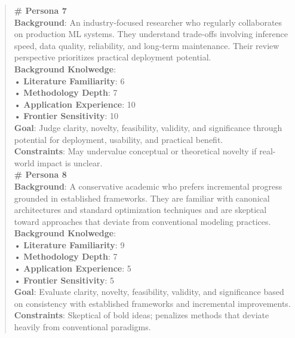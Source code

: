 \begin{quote}
\begin{tcolorbox}[breakable,colback=persona!20!white, colframe=persona!60!black, title=\textbf{Personas}]
        \textbf{\# Persona 7}\\
        \textbf{Background}: An industry-focused researcher who regularly collaborates on production ML systems. They understand trade-offs involving inference speed, data quality, reliability, and long-term maintenance. Their review perspective prioritizes practical deployment potential.\\
        \textbf{Background Knolwedge}:\\
        • \textbf{Literature Familiarity}: 6\\
        • \textbf{Methodology Depth}: 7\\
        • \textbf{Application Experience}: 10\\
        • \textbf{Frontier Sensitivity}: 10\\
        \textbf{Goal}: Judge clarity, novelty, feasibility, validity, and significance through potential for deployment, usability, and practical benefit.\\
        \textbf{Constraints}: May undervalue conceptual or theoretical novelty if real-world impact is unclear.\\

        \textbf{\# Persona 8}\\
        \textbf{Background}: A conservative academic who prefers incremental progress grounded in established frameworks. They are familiar with canonical architectures and standard optimization techniques and are skeptical toward approaches that deviate from conventional modeling practices.\\
        \textbf{Background Knolwedge}:\\
        • \textbf{Literature Familiarity}: 9\\
        • \textbf{Methodology Depth}: 7\\
        • \textbf{Application Experience}: 5\\
        • \textbf{Frontier Sensitivity}: 5\\
        \textbf{Goal}: Evaluate clarity, novelty, feasibility, validity, and significance based on consistency with established frameworks and incremental improvements.\\
        \textbf{Constraints}: Skeptical of bold ideas; penalizes methods that deviate heavily from conventional paradigms.\\


\end{tcolorbox}
\end{quote}
